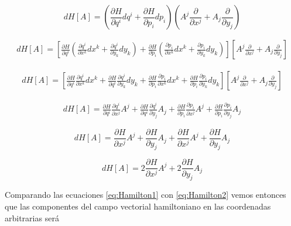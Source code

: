 \documentclass[a4paper,10pt]{article}
\numberwithin{equation}{section}
\begin{document}
\begin{equation}
 dH[A] = \left( \frac{\partial H}{\partial q^i}dq^i + \frac{\partial H}{\partial p_i}dp_i\right)
 \left(A^j\frac{\partial}{\partial x^j} + A_j \frac{\partial}{\partial y_j}\right)
\end{equation}

\begin{align*}
 dH[A] = \left[ \frac{\partial H}{\partial q^i}\left(\frac{\partial q^i}{\partial x^k}dx^k + \frac{\partial q^i}{\partial y_k}dy_k  \right)
 + \frac{\partial H}{\partial p_i}\left(\frac{\partial p_i}{\partial x^k}dx^k + \frac{\partial p_i}{\partial y_k}dy_k  \right)\right]
 \left[A^j\frac{\partial}{\partial x^j} + A_j \frac{\partial}{\partial y_j}\right]
\end{align*}

\begin{align*}
 dH[A] = \left[ \frac{\partial H}{\partial q^i}\frac{\partial q^i}{\partial x^k}dx^k + \frac{\partial H}{\partial q^i}\frac{\partial q^i}{\partial y_k}dy_k
 + \frac{\partial H}{\partial p_i}\frac{\partial p_i}{\partial x^k}dx^k + \frac{\partial H}{\partial p_i}\frac{\partial p_i}{\partial y_k}dy_k \right]
 \left[A^j\frac{\partial}{\partial x^j} + A_j \frac{\partial}{\partial y_j}\right]
\end{align*}

\begin{align}
 dH[A] = \frac{\partial H}{\partial q^i}\frac{\partial q^i}{\partial x^j}A^j + \frac{\partial H}{\partial q^i}\frac{\partial q^i}{\partial y_j}A_j
 + \frac{\partial H}{\partial p_i}\frac{\partial p_i}{\partial x^j}A^j + \frac{\partial H}{\partial p_i}\frac{\partial p_i}{\partial y_j}A_j 
\end{align}

\begin{equation}
 dH[A] =  \frac{\partial H}{\partial x^j}A^j + \frac{\partial H}{\partial y_j}A_j
 + \frac{\partial H}{\partial x^j}A^j + \frac{\partial H}{\partial y_j}A_j
\end{equation}

\begin{equation}
 dH[A] =  2\frac{\partial H}{\partial x^j}A^j + 2\frac{\partial H}{\partial y_j}A_j
 \label{eq:Hamilton2}
\end{equation}

Comparando las ecuaciones \eqref{eq:Hamilton1} con \eqref{eq:Hamilton2} vemos entonces 
que las componentes del campo vectorial hamiltoniano en las coordenadas arbitrarias será 
\end{document}
